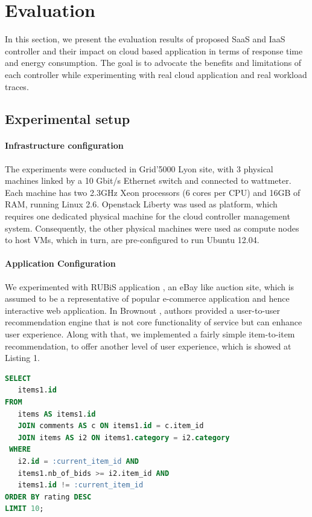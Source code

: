 \section{Evaluation}
In this section, we present the evaluation results of proposed SaaS and IaaS controller and their impact on cloud based application
in terms of response time and energy consumption. The goal is to advocate the benefits
and limitations of each controller while experimenting
with real cloud application and real workload traces.

\subsection{Experimental setup}
\paragraph*{\textbf{Infrastructure configuration}}The experiments were conducted in Grid'5000 Lyon site,
with 3 physical machines linked by a 10 Gbit/s Ethernet
switch and connected to wattmeter. Each machine has two
2.3GHz Xeon processors (6 cores per CPU) and 16GB of
RAM, running Linux 2.6. Openstack Liberty was used
as platform, which requires one dedicated physical machine
for the cloud controller management system. Consequently,
the other physical machines were used as compute nodes to
host VMs, which in turn, are pre-configured to run Ubuntu
12.04.

\paragraph*{\textbf{Application Configuration}} We experimented with
RUBiS application \cite{rubis}, an eBay like auction site, which
is assumed to be a representative of popular e-commerce application 
and hence interactive web application. In Brownout \cite{brownout}, authors provided a user-to-user recommendation engine that is not core functionality of service but can enhance user experience. Along with that, we implemented a fairly simple item-to-item recommendation, to offer another level of user experience, which is showed at Listing 1. 

\begin{lstlisting}[language=SQL,caption={SQL statement for the recommender system.}, label={sql}]
SELECT
   items1.id
FROM
   items AS items1.id
   JOIN comments AS c ON items1.id = c.item_id
   JOIN items AS i2 ON items1.category = i2.category
 WHERE 
   i2.id = :current_item_id AND
   items1.nb_of_bids >= i2.item_id AND
   items1.id != :current_item_id
ORDER BY rating DESC
LIMIT 10;   
\end{lstlisting}



